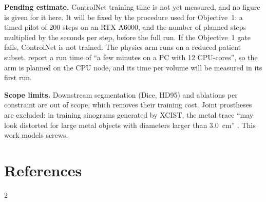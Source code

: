 \documentclass[9pt]{extarticle}
\begin{document}
\textbf{Pending estimate.} ControlNet training time is not yet measured, and no figure is given for it here. It will be fixed by the procedure used for Objective~1: a timed pilot of 200 steps on an RTX A6000, and the number of planned steps multiplied by the seconds per step, before the full run. If the Objective~1 gate fails, ControlNet is not trained. The physics arm runs on a reduced patient subset. \citet{wu2022xcist} report a run time of ``a few minutes on a PC with 12 CPU-cores'', so the arm is planned on the CPU node, and its time per volume will be measured in its first run.

\textbf{Scope limits.} Downstream segmentation (Dice, HD95) and ablations per constraint are out of scope, which removes their training cost. Joint prostheses are excluded: in training sinograms generated by XCIST, the metal trace ``may look distorted for large metal objects with diameters larger than 3.0~cm'' \citep{haneda2025aapm}. This work models screws.

\section{References}
\vspace{-6pt}
\scriptsize
\renewcommand{\bibsection}{}
\setlength{\bibsep}{0.6pt}
\setlength{\bibhang}{8pt}
\begin{multicols}{2}


\end{multicols}
\end{document}

